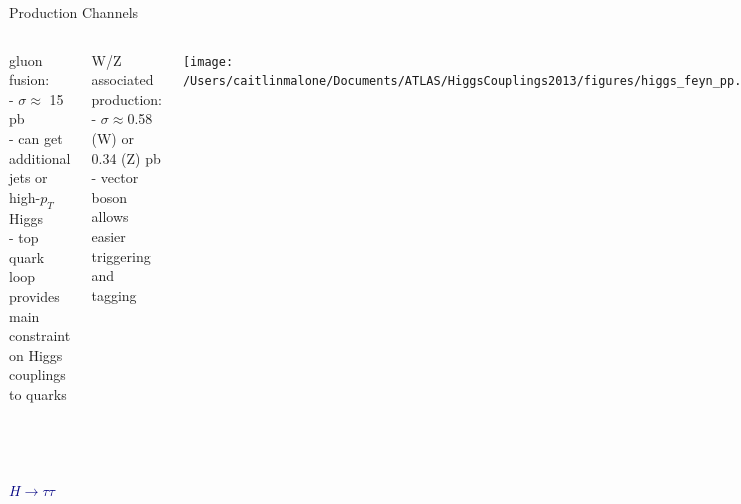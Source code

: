 \documentclass{beamer}
\begin{document}
\begin{frame}{Production Channels}
	\begin{columns}[c]
		\scriptsize \textcolor{BrickRed}{gluon fusion:} \\
		- $\sigma\approx$ 15 pb \\
		- can get additional jets or high-$p_T$ Higgs \\
		- top quark loop provides main constraint on Higgs couplings to quarks
		\vspace{1cm}
		
		\textcolor{BrickRed}{W/Z associated production:} \\
		- $\sigma\approx$0.58 (W) or 0.34 (Z) pb \\
		- vector boson allows easier triggering and tagging
		
		\texttt{[image: /Users/caitlinmalone/Documents/ATLAS/HiggsCouplings2013/figures/higgs\_feyn\_pp.pdf]}
		
		
		\scriptsize \textcolor{BrickRed}{ttH:}\\
		- $\sigma\approx$ 0.086 pb\\
		- top quarks allow easier triggering and tagging
		
		\vspace{2cm}
		
		\textcolor{BrickRed}{Vector Boson Fusion:} \\
		- $\sigma\approx$1.2 pb \\
		- forward jets provide unique signature		
	\end{columns}
\end{frame}






\begin{frame}[c]
	\frametitle{\ }
	\begin{center}
	\huge \textcolor{Navy}{$H\rightarrow\tau\tau$}
	\end{center}
\end{frame}
\end{document}
